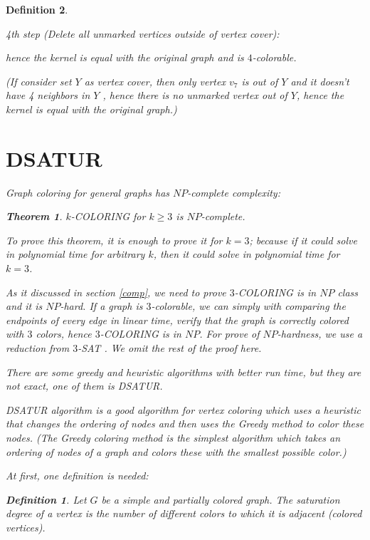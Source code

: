 \documentclass[12pt]{article}
\theoremstyle{slplain}
\newtheorem{theorem}{Theorem}
\newtheorem{defi}{Definition}
\begin{document}
\begin{defi}
\begin{enumerate}
4th step (Delete all unmarked vertices outside of vertex cover):
 
 hence the kernel is equal with 
the original graph and is $4$-colorable.

(If consider set $Y$ as vertex cover, then only vertex $v_7$ is out of $Y$ and it doesn't have 4 neighbors in $Y$ , hence there is no unmarked vertex out of $Y$, hence the kernel is equal with the original graph.)

\newpage

\section{DSATUR}{\label{dsat}}
Graph coloring for general graphs has $NP$-complete complexity:

\begin{theorem}
$k$-COLORING for $k \geq 3$ is $NP$-complete. \cite{karp}
\end{theorem}

To prove this theorem, it is enough to prove it for $k = 3$; because if it could solve in polynomial time for arbitrary $k$, then it could solve in polynomial time for $k=3$. 

As it discussed in section \ref{comp}, we need to prove $3$-COLORING is in $NP$ class and it is $NP$-hard. If a graph is $3$-colorable, we can simply with comparing the endpoints of every edge in linear time, verify that the graph is correctly colored with $3$ colors, hence $3$-COLORING is in $NP$.  For prove of $NP$-hardness, we use a reduction from $3$-SAT \cite{karp}. We omit the rest of the proof here.

There are some greedy and heuristic algorithms with better run time, but they are not exact, one of them is DSATUR.

DSATUR algorithm is a good algorithm for vertex coloring which uses a heuristic that changes the ordering of nodes and then uses the Greedy method to color these nodes. (The Greedy coloring method is the simplest algorithm which takes an ordering of nodes of a graph and colors these with the smallest possible color.)

At first, one definition is needed:

\begin{defi}
Let $G$ be a simple and partially colored graph. The saturation degree of a vertex is the number of different colors to which it is adjacent (colored vertices).\cite{brelaz}
\end{defi}


\end{enumerate}
\end{defi}
\end{document}
